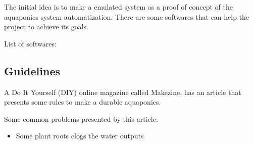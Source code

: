 The initial idea is to make a emulated system as a proof of concept of the aquaponics system automatization.
There are some softwares that can help the project to achieve its goals.

List of softwares:


\subsection{Guidelines}
A Do It Yourself (DIY) online magazine called Makezine,
has an article \cite{Kretzinger2015} that presents some rules to make a durable aquaponics.

Some common problems presented by this article:
\begin{itemize}
    \item Some plant roots clogs the water outputs
\end{itemize}
